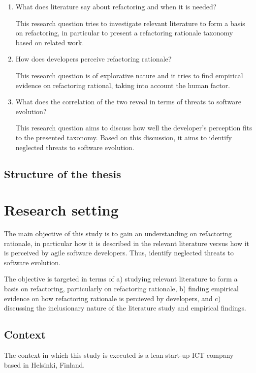\documentclass[english,12pt,a4paper,pdftex,sci,utf8]{aaltothesis}
\begin{document}
\begin{enumerate}[label=\textbf{RQ\arabic*}]
\item What does literature say about refactoring and when it is needed?

This research question tries to investigate relevant literature to form a basis on refactoring, in particular to present a refactoring rationale taxonomy based on related work.
\item How does developers perceive refactoring rationale?

This research question is of explorative nature and it tries to find empirical evidence on refactoring rational, taking into account the human factor. 
\item What does the correlation of the two reveal in terms of threats to software evolution?

This research question aims to discuss how well the developer's perception fits to the presented taxonomy. Based on this discussion, it aims to identify neglected threats to software evolution.
\end{enumerate}

\subsection{Structure of the thesis} \label{structure}
\clearpage

\section{Research setting} \label{research setting}

The main objective of this study is to gain an understanding on refactoring rationale, in particular how it is described in the relevant literature versus how it is perceived by agile software developers. Thus, identify neglected threats to software evolution. 

The objective is targeted in terms of a) studying relevant literature to form a basis on refactoring, particularly on refactoring rationale, b) finding empirical evidence on how refactoring rationale is percieved by developers, and c) discussing the inclusionary nature of the literature study and empirical findings. 
\subsection{Context} \label{context}
The context in which this study is executed is a lean start-up ICT company based in Helsinki, Finland.
\end{document}
